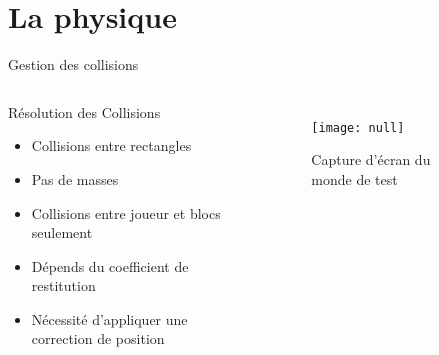 \documentclass{beamer}
\begin{document}
{\section{La physique}
\begin{frame}{Gestion des collisions}
    \begin{columns}
        \begin{block}{Résolution des Collisions}
            \begin{itemize}
                \item[\bullet] Collisions entre rectangles 
                \item[\bullet] Pas de masses
                \item[\bullet] Collisions entre joueur et blocs seulement
                \item[\bullet] Dépends du coefficient de restitution
                \item [\bullet] Nécessité d'appliquer une correction de position
            \end{itemize}
        \end{block}
        \begin{figure}
            \centering
            \texttt{[image: null]}
            \caption{Capture d'écran du monde de test}
        \end{figure}
    \end{columns}
\end{frame}

}
\end{document}
